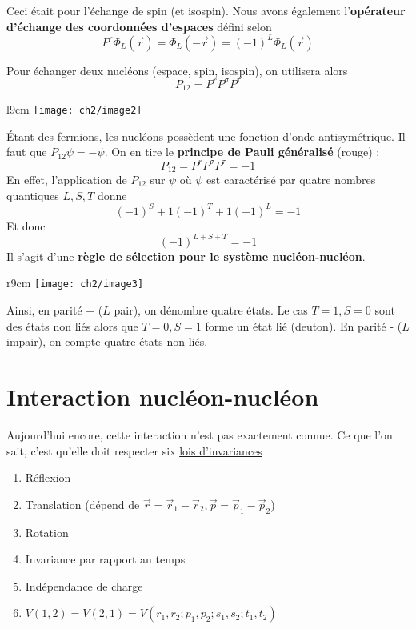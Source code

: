 Ceci était pour l'échange de spin (et isospin). Nous avons également l'\textbf{opérateur d'échange des 
coordonnées d'espaces} défini selon
\begin{equation}
P^r\Phi_L(\vec{r}) = \Phi_L(-\vec{r})=(-1)^L\Phi_L(\vec{r})
\end{equation}

Pour échanger deux nucléons (espace, spin, isospin), on utilisera alors
\begin{equation}
P_{12} = P^rP^\sigma P^\tau
\end{equation}

\newpage


	\begin{wrapfigure}[7]{l}{9cm}
	\vspace{-1mm}
	\texttt{[image: ch2/image2]}
	\end{wrapfigure}

Étant des fermions, les nucléons possèdent une fonction d'onde antisymétrique. Il faut que $P_{12}\psi = -\psi$. 
On en tire le \textbf{principe de Pauli généralisé} (rouge) :
\begin{equation}
P_{12} = P^rP^\sigma P^\tau = -1
\end{equation}
En effet, l'application de $P_{12}$ sur $\psi$ où $\psi$ est caractérisé par quatre nombres quantiques $L,S,T$ donne
\begin{equation}
(-1)^S+1 (-1)^T+1 (-1)^L = -1
\end{equation}
Et donc
\begin{equation}
(-1)^{L+S+T} =-1
\end{equation}
Il s'agit d'une \textbf{règle de sélection pour le système nucléon-nucléon}. \\


	\begin{wrapfigure}[6]{r}{9cm}
	\vspace{-1mm}
	\texttt{[image: ch2/image3]}
	\end{wrapfigure}
Ainsi, en parité + ($L$ pair), on dénombre quatre états. Le cas $T=1,S=0$ sont des états non liés alors
que $T=0, S=1$ forme un état lié (deuton). En parité - ($L$ impair), on compte quatre états non liés.
	
	
	
\section{Interaction nucléon-nucléon}
Aujourd'hui encore, cette interaction n'est pas exactement connue. Ce que l'on sait, c'est qu'elle doit 
respecter six \underline{lois d'invariances}
\begin{enumerate}
\item Réflexion
\item Translation (dépend de $\vec{r}=\vec r_1-\vec r_2, \vec p = \vec p_1-\vec p_2$)
\item Rotation
\item Invariance par rapport au temps
\item Indépendance de charge
\item $V(1,2)=V(2,1)=V(r_1,r_2;p_1,p_2;s_1,s_2;t_1,t_2)$
\end{enumerate}\ \\

